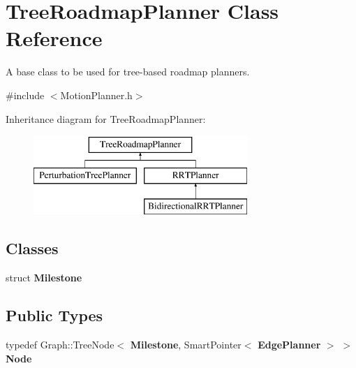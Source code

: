 \section{Tree\+Roadmap\+Planner Class Reference}
\label{classTreeRoadmapPlanner}


A base class to be used for tree-\/based roadmap planners.  




{\ttfamily \#include $<$Motion\+Planner.\+h$>$}

Inheritance diagram for Tree\+Roadmap\+Planner\+:\begin{figure}[H]
\begin{center}
\leavevmode
\includegraphics[height=3.000000cm]{classTreeRoadmapPlanner}
\end{center}
\end{figure}
\subsection*{Classes}
\begin{DoxyCompactItemize}
\item 
struct {\bf Milestone}
\end{DoxyCompactItemize}
\subsection*{Public Types}
\begin{DoxyCompactItemize}
\item 
typedef Graph\+::\+Tree\+Node$<$ {\bf Milestone}, Smart\+Pointer$<$ {\bf Edge\+Planner} $>$ $>$ {\bfseries Node}\label{classTreeRoadmapPlanner_a15e4ae956786e808f8fba50959ebf6cd}

\end{DoxyCompactItemize}
